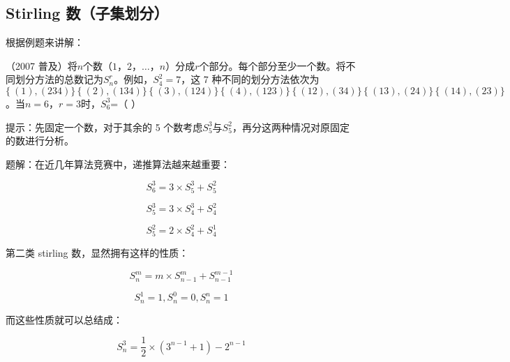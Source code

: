 
\subsection{Stirling 数（子集划分）}

根据例题来讲解：

（2007 普及）将$n$个数$（1，2，…，n）$分成$r$个部分。每个部分至少一个数。将不同划分方法的总数记为$S_n^r$。例如，$S_4^2=7$，这 7 种不同的划分方法依次为 $\{\ (1) , (234) \}\,\{\ (2) ,  (134) \}\,\{\ (3) , (124) \}\,\{\ (4) , (123) \}\,\{\ (12) , (34) \}\,\{\ (13) , (24) \}\,\{\ (14) , (23) \}$。当$n=6，r=3$时，$S_6^3$=（    ）

\begin{QUOTE}{}{}
提示：先固定一个数，对于其余的 5 个数考虑$S_5^3$与$S_5^2$，再分这两种情况对原固定的数进行分析。
\end{QUOTE}

题解：在近几年算法竞赛中，递推算法越来越重要：

$$
S_6^3=3 \times S_5^3 + S_5^2
$$

$$
S_5^3=3 \times S_4^3 + S_4^2
$$

$$
S_5^2=2 \times S_4^2 + S_4^1
$$

第二类 stirling 数，显然拥有这样的性质：

$$
S_n^m = m \times S_{n-1}^{m} + S_{n-1}^{m-1}
$$

$$
S_n^1 = 1,S_n^0 = 0,S_n^n = 1
$$

而这些性质就可以总结成：

$$
S_n^3 = \frac{1}{2} \times (3^{n-1}+1) - 2^{n-1}
$$
